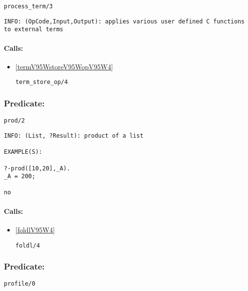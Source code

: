 \begin{verbatim}
process_term/3
\end{verbatim}

{\small \begin{verbatim}
INFO: (OpCode,Input,Output): applies various user defined C functions to external terms

\end{verbatim}}
\paragraph{Calls:} 
\begin{itemize}
\item \ref{termV95WstoreV95WopV95W4} 
\begin{verbatim}
term_store_op/4
\end{verbatim}

\end{itemize}

\subsubsection{Predicate:} \label{prodV95W2}

\begin{verbatim}
prod/2
\end{verbatim}

{\small \begin{verbatim}
INFO: (List, ?Result): product of a list

EXAMPLE(S):

?-prod([10,20],_A).
_A = 200;

no

\end{verbatim}}
\paragraph{Calls:} 
\begin{itemize}
\item \ref{foldlV95W4} 
\begin{verbatim}
foldl/4
\end{verbatim}

\end{itemize}

\subsubsection{Predicate:} \label{profileV95W0}

\begin{verbatim}
profile/0
\end{verbatim}

